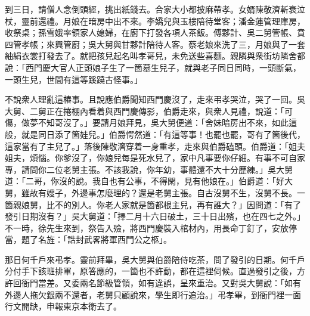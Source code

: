 到三日，請僧人念倒頭經，挑出紙錢去。合家大小都披麻帶孝。女婿陳敬濟斬衰泣杖，靈前還禮。月娘在暗房中出不來。李嬌兒與玉樓陪待堂客；潘金蓮管理庫房，收祭桌；孫雪娥率領家人媳婦，在廚下打發各項人茶飯。傅夥計、吳二舅管帳、賁四管孝帳；來興管廚；吳大舅與甘夥計陪待人客。蔡老娘來洗了三，月娘與了一套紬絹衣裳打發去了。就把孩兒起名叫孝哥兒，未免送些喜麵。親隣與衆街坊隣舍都說：「西門慶大官人正頭娘子生了一箇墓生兒子，就與老子同日同時，一頭斷氣，一頭生兒，世間有這等蹊蹺古怪事。」

不說衆人理亂這樁事。且說應伯爵聞知西門慶沒了，走來弔孝哭泣，哭了一回。吳大舅、二舅正在捲棚內看着與西門慶傳影，伯爵走來，與衆人見禮，說道：「可傷，做夢不知哥沒了。」要請月娘拜見，吳大舅便道：「舍妹暗房出不來，如此這般，就是同日添了箇娃兒。」伯爵愕然道：{}「有這等事！也罷也罷，哥有了箇後代，這家當有了主兒了。」落後陳敬濟穿着一身重孝，走來與伯爵磕頭。伯爵道：「姐夫姐夫，煩惱。你爹沒了，你娘兒每是死水兒了，家中凡事要你仔細。有事不可自家專，請問你二位老舅主張。不該我說，你年幼，事體還不大十分歷練。」{}吳大舅道：「二哥，你沒的說。我自也有公事，不得閑，見有他娘在。」伯爵道：「好大舅，雖故有嫂子，外邊事怎麼理的？還是老舅主張。自古沒舅不生，沒舅不長。一箇親娘舅，比不的別人。你老人家就是箇都根主兒，再有誰大？」{}因問道：「有了發引日期沒有？」吳大舅道：「擇二月十六日破土，三十日出殯，也在四七之外。」不一時，徐先生來到，祭告入殮，將西門慶裝入棺材內，用長命丁釘了，安放停當，題了名旌：「誥封武畧將軍西門公之柩」。

那日何千戶來弔孝。靈前拜畢，吳大舅與伯爵陪侍吃茶，問了發引的日期。何千戶分付手下該班排軍，原答應的，一箇也不許動，都在這裡伺候。直過發引之後，方許回衙門當差。又委兩名節級管領，如有違誤，呈來重治。又對吳大舅說：「如有外邊人拖欠銀兩不還者，老舅只顧說來，學生即行追治。」{}弔孝畢，到衙門裡一面行文開缺，申報東京本衛去了。

